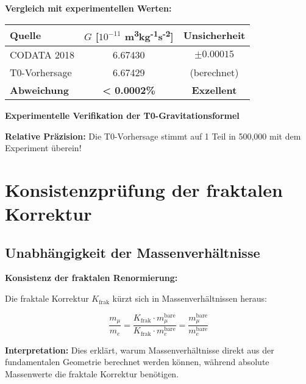 \documentclass[12pt,a4paper]{article}
\begin{document}
	\begin{verification}
		\textbf{Vergleich mit experimentellen Werten:}
		
		\begin{center}
			\begin{tabular}{lcc}
				\toprule
				\textbf{Quelle} & \textbf{$G$ [$10^{-11}$ m\textsuperscript{3}kg\textsuperscript{-1}s\textsuperscript{-2}]} & \textbf{Unsicherheit} \\
				\midrule
				CODATA 2018 & 6.67430 & $\pm 0.00015$ \\
				T0-Vorhersage & 6.67429 & (berechnet) \\
				\textbf{Abweichung} & \textbf{< 0.0002\%} & \textbf{Exzellent} \\
				\bottomrule
			\end{tabular}
		\end{center}
		
		\textbf{Experimentelle Verifikation der T0-Gravitationsformel}
		
		\textbf{Relative Präzision:} Die T0-Vorhersage stimmt auf 1 Teil in 500,000 mit dem Experiment überein!
	\end{verification}
	
	\section{Konsistenzprüfung der fraktalen Korrektur}
	
	\subsection{Unabhängigkeit der Massenverhältnisse}
	
	\begin{keyresult}
		\textbf{Konsistenz der fraktalen Renormierung:}
		
		Die fraktale Korrektur $K_{\text{frak}}$ kürzt sich in Massenverhältnissen heraus:
		
		\begin{equation}
			\frac{m_\mu}{m_e} = \frac{K_{\text{frak}} \cdot m_\mu^{\text{bare}}}{K_{\text{frak}} \cdot m_e^{\text{bare}}} = \frac{m_\mu^{\text{bare}}}{m_e^{\text{bare}}}
		\end{equation}
		
		\textbf{Interpretation:} 
		Dies erklärt, warum Massenverhältnisse direkt aus der fundamentalen Geometrie berechnet werden können, während absolute Massenwerte die fraktale Korrektur benötigen.
	\end{keyresult}
	
\end{document}
